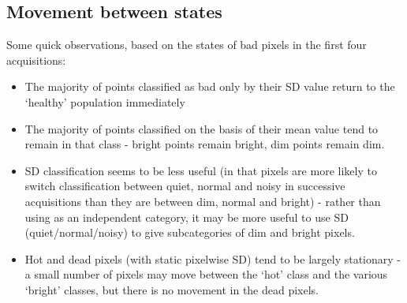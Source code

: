 \documentclass[10pt,fleqn]{article}
\begin{document}
\subsection*{Movement between states}
Some quick observations, based on the states of bad pixels in the first four acquisitions:
\begin{itemize}
\item The majority of points classified as bad only by their SD value return to the `healthy' population immediately

\item The majority of points classified on the basis of their mean value tend to remain in that class - bright points remain bright, dim points remain dim.

\item SD classification seems to be less useful (in that pixels are more likely to switch classification between quiet, normal and noisy in successive acquisitions than they are between dim, normal and bright) - rather than using as an independent category, it may be more useful to use SD (quiet/normal/noisy) to give subcategories of dim and bright pixels.

\item Hot and dead pixels (with static pixelwise SD) tend to be largely stationary - a small number of pixels may move between the `hot' class and the various `bright' classes, but there is no movement in the dead pixels.
\end{itemize}
\end{document}

